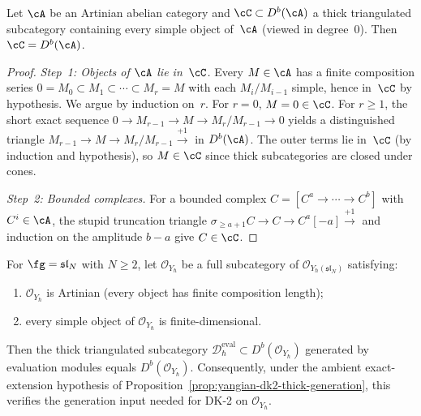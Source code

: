 \begin{lemma}
\label{lem:composition-thick-generation}
Let $\cA$ be an Artinian abelian category and
$\cC \subset D^b(\cA)$ a thick triangulated subcategory containing
every simple object of~$\cA$ (viewed in degree~$0$). Then
$\cC = D^b(\cA)$.
\end{lemma}

\begin{proof}
\emph{Step~1: Objects of $\cA$ lie in~$\cC$.}
Every $M \in \cA$ has a finite composition series
$0 = M_0 \subset M_1 \subset \cdots \subset M_r = M$
with each $M_i/M_{i-1}$ simple, hence in~$\cC$ by hypothesis.
We argue by induction on~$r$. For $r = 0$, $M = 0 \in \cC$.
For $r \ge 1$, the short exact sequence
$0 \to M_{r-1} \to M \to M_r/M_{r-1} \to 0$
yields a distinguished triangle
$M_{r-1} \to M \to M_r/M_{r-1} \xrightarrow{+1}$
in $D^b(\cA)$.
The outer terms lie in~$\cC$ (by induction and hypothesis),
so $M \in \cC$ since thick subcategories are closed under cones.

\emph{Step~2: Bounded complexes.}
For a bounded complex $C = [C^a \to \cdots \to C^b]$ with
$C^i \in \cA$, the stupid truncation triangle
$\sigma_{\ge a+1}C \to C \to C^a[-a] \xrightarrow{+1}$
and induction on the amplitude $b - a$ give $C \in \cC$.
\end{proof}

\begin{theorem}
\label{thm:catO-thick-generation}
For $\fg = \mathfrak{sl}_N$ with $N \ge 2$, let
$\mathcal{O}_{Y_\hbar}$ be a full subcategory of
$\mathcal{O}_{Y_\hbar(\mathfrak{sl}_N)}$ satisfying:
\begin{enumerate}[label=\textup{(\alph*)}]
\item $\mathcal{O}_{Y_\hbar}$ is Artinian
 \textup{(}every object has finite composition length\textup{)};
\item every simple object of $\mathcal{O}_{Y_\hbar}$ is
 finite-dimensional.
\end{enumerate}
Then the thick triangulated subcategory
$\mathcal{D}_\hbar^{\mathrm{eval}} \subset
D^b(\mathcal{O}_{Y_\hbar})$
generated by evaluation modules equals
$D^b(\mathcal{O}_{Y_\hbar})$.
Consequently, under the ambient exact-extension hypothesis of
Proposition~\textup{\ref{prop:yangian-dk2-thick-generation}}, this
verifies the generation input needed for DK-2 on
$\mathcal{O}_{Y_\hbar}$.
\end{theorem}

